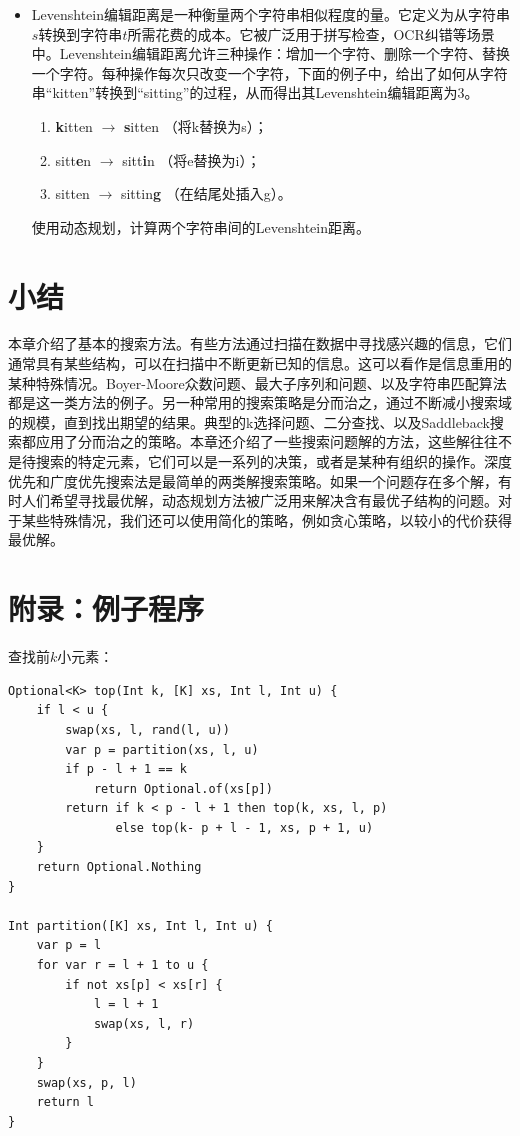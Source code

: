 \documentclass[b5paper]{ctexart}
\begin{document}
\begin{Exercise}
\begin{itemize}
\item Levenshtein编辑距离是一种衡量两个字符串相似程度的量。它定义为从字符串$s$转换到字符串$t$所需花费的成本。它被广泛用于拼写检查，OCR纠错等场景中。Levenshtein编辑距离允许三种操作：增加一个字符、删除一个字符、替换一个字符。每种操作每次只改变一个字符，下面的例子中，给出了如何从字符串“kitten”转换到“sitting”的过程，从而得出其Levenshtein编辑距离为3。
  \begin{enumerate}
  \item \textbf{k}itten $\rightarrow$ \textbf{s}itten （将k替换为s）；
  \item sitt\textbf{e}n $\rightarrow$ sitt\textbf{i}n （将e替换为i）；
  \item sitten $\rightarrow$ sittin\textbf{g} （在结尾处插入g）。
  \end{enumerate}
使用动态规划，计算两个字符串间的Levenshtein距离。
\end{itemize}
\end{Exercise}

\section{小结}

本章介绍了基本的搜索方法。有些方法通过扫描在数据中寻找感兴趣的信息，它们通常具有某些结构，可以在扫描中不断更新已知的信息。这可以看作是信息重用的某种特殊情况。Boyer-Moore众数问题、最大子序列和问题、以及字符串匹配算法都是这一类方法的例子。另一种常用的搜索策略是分而治之，通过不断减小搜索域的规模，直到找出期望的结果。典型的k选择问题、二分查找、以及Saddleback搜索都应用了分而治之的策略。本章还介绍了一些搜索问题解的方法，这些解往往不是待搜索的特定元素，它们可以是一系列的决策，或者是某种有组织的操作。深度优先和广度优先搜索法是最简单的两类解搜索策略。如果一个问题存在多个解，有时人们希望寻找最优解，动态规划方法被广泛用来解决含有最优子结构的问题。对于某些特殊情况，我们还可以使用简化的策略，例如贪心策略，以较小的代价获得最优解。

\section{附录：例子程序}

查找前$k$小元素：

\begin{lstlisting}[language = Bourbaki]
Optional<K> top(Int k, [K] xs, Int l, Int u) {
    if l < u {
        swap(xs, l, rand(l, u))
        var p = partition(xs, l, u)
        if p - l + 1 == k
            return Optional.of(xs[p])
        return if k < p - l + 1 then top(k, xs, l, p)
               else top(k- p + l - 1, xs, p + 1, u)
    }
    return Optional.Nothing
}

Int partition([K] xs, Int l, Int u) {
    var p = l
    for var r = l + 1 to u {
        if not xs[p] < xs[r] {
            l = l + 1
            swap(xs, l, r)
        }
    }
    swap(xs, p, l)
    return l
}
\end{lstlisting}
\end{document}
